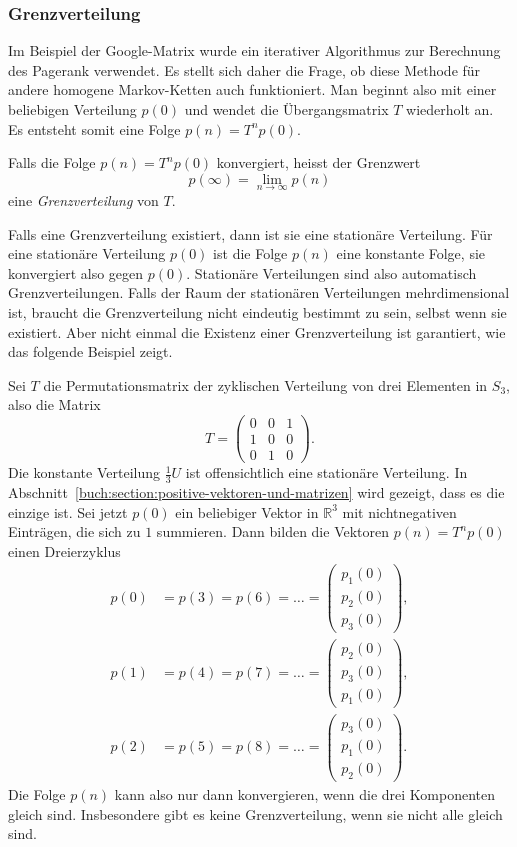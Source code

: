 \subsubsection{Grenzverteilung}
Im Beispiel der Google-Matrix wurde ein iterativer Algorithmus
zur Berechnung des Pagerank verwendet.
Es stellt sich daher die Frage, ob diese Methode für andere homogene
Markov-Ketten auch funktioniert.
Man beginnt also mit einer beliebigen Verteilung $p(0)$ und wendet
die Übergangsmatrix $T$ wiederholt an.
Es entsteht somit eine Folge $p(n) = T^np(0)$.

\begin{definition}
Falls die Folge $p(n) = T^np(0)$ konvergiert, heisst der Grenzwert
\[
p(\infty) = \lim_{n\to\infty} p(n)
\]
eine {\em Grenzverteilung} von $T$.
%
\end{definition}

Falls eine Grenzverteilung existiert, dann ist sie eine stationäre
Verteilung.
Für eine stationäre Verteilung $p(0)$ ist die Folge $p(n)$ eine
konstante Folge, sie konvergiert also gegen $p(0)$.
Stationäre Verteilungen sind also automatisch Grenzverteilungen.
Falls der Raum der stationären Verteilungen mehrdimensional ist,
braucht die Grenzverteilung nicht eindeutig bestimmt zu sein, selbst
wenn sie existiert.
Aber nicht einmal die Existenz einer Grenzverteilung ist garantiert,
wie das folgende Beispiel zeigt.

\begin{beispiel}
Sei $T$ die Permutationsmatrix der zyklischen Verteilung von drei
Elementen in $S_3$, also die Matrix
\[
T=\begin{pmatrix}
0&0&1\\
1&0&0\\
0&1&0
\end{pmatrix}.
\]
Die konstante Verteilung $\frac13U$ ist offensichtlich eine
stationäre Verteilung.
In Abschnitt~\ref{buch:section:positive-vektoren-und-matrizen}
wird gezeigt, dass es die einzige ist.
Sei jetzt $p(0)$ ein beliebiger Vektor in $\mathbb{R}^3$ mit
nichtnegativen Einträgen, die sich zu $1$ summieren.
Dann bilden die Vektoren $p(n)=T^np(0)$ einen Dreierzyklus
\begin{align*}
p(0)&=p(3)=p(6)=\dots =\begin{pmatrix}p_1(0)\\p_2(0)\\p_3(0)\end{pmatrix},
\\
p(1)&=p(4)=p(7)=\dots =\begin{pmatrix}p_2(0)\\p_3(0)\\p_1(0)\end{pmatrix},
\\
p(2)&=p(5)=p(8)=\dots =\begin{pmatrix}p_3(0)\\p_1(0)\\p_2(0)\end{pmatrix}.
\end{align*}
Die Folge $p(n)$ kann also nur dann konvergieren, wenn die drei
Komponenten gleich sind.
Insbesondere gibt es keine Grenzverteilung, wenn sie nicht alle
gleich sind.
\end{beispiel}

